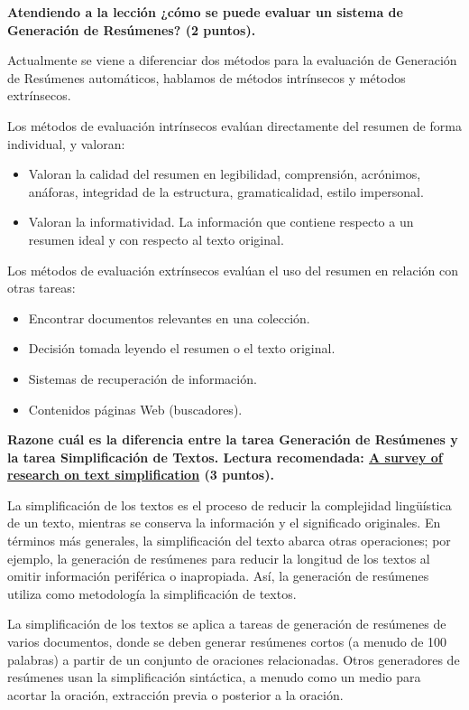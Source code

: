 \documentclass[11pt]{exam}
\begin{document}
\begin{questions}
{\bf \question Atendiendo a la lección ¿cómo se puede evaluar un sistema de Generación de Resúmenes? (2 puntos).}

Actualmente se viene a diferenciar dos métodos para la evaluación de Generación de Resúmenes automáticos, hablamos de métodos intrínsecos y métodos extrínsecos.

\newpage

Los métodos de evaluación intrínsecos evalúan directamente del resumen de forma individual, y valoran:

\begin{itemize}
	\item Valoran la calidad del resumen en legibilidad, comprensión, acrónimos, anáforas, integridad de la estructura, gramaticalidad, estilo impersonal.
	\item Valoran la informatividad. La información que contiene respecto a un resumen ideal y con respecto al texto original.
\end{itemize}

Los métodos de evaluación extrínsecos evalúan el uso del resumen en relación con otras tareas:

\begin{itemize}
	\item Encontrar documentos relevantes en una colección.
	\item Decisión tomada leyendo el resumen o el texto original.
	\item Sistemas de recuperación de información.
	\item Contenidos páginas Web (buscadores).
\end{itemize}

{\bf \question Razone cuál es la diferencia entre la tarea Generación de Resúmenes y la tarea Simplificación de Textos. Lectura recomendada: \href{https://pdfs.semanticscholar.org/8a30/f16ed3a83734c4ec087191401a8f241aa3a9.pdf}{A survey of research on text simplification} (3 puntos).}

La simplificación de los textos es el proceso de reducir la complejidad lingüística de un texto, mientras se conserva la información y el significado originales. En términos más generales, la simplificación del texto abarca otras operaciones; por ejemplo, la generación de resúmenes para reducir la longitud de los textos al omitir información periférica o inapropiada. Así, la generación de resúmenes utiliza como metodología la simplificación de textos.

La simplificación de los textos se aplica a tareas de generación de resúmenes de varios documentos, donde se deben generar resúmenes cortos (a menudo de 100 palabras) a partir de un conjunto de oraciones relacionadas. Otros generadores de resúmenes usan la simplificación sintáctica, a menudo como un medio para acortar la oración, extracción previa o posterior a la oración. 


\end{questions}
\end{document}

